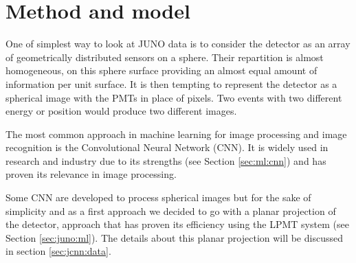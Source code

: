 \documentclass[../main.tex]{subfiles}
\begin{document}
{{\section{Method and model}

One of simplest way to look at JUNO data is to consider the detector as an array of geometrically distributed sensors on a sphere. Their repartition is almost homogeneous, on this sphere surface providing an almost equal amount of information per unit surface. It is then tempting to represent the detector as a spherical image with the PMTs in place of pixels. Two events with two different energy or position would produce two different images.

The most common approach in machine learning for image processing and image recognition is the Convolutional Neural Network (CNN). It is widely used in research and industry \cite{simonyan_very_2015, ciresan_multi-column_2012, abbasi_convolutional_2021, maksimovic_cnns_2021} due to its strengths (see Section \ref{sec:ml:cnn}) and has proven its relevance in image processing.

Some CNN are developed to process spherical images \cite{cohen_spherical_2018} but for the sake of simplicity and as a first approach we decided to go with a planar projection of the detector, approach that has proven its efficiency using the LPMT system (see Section \ref{sec:juno:ml}). The details about this planar projection will be discussed in section \ref{sec:jcnn:data}.

}}
\end{document}
